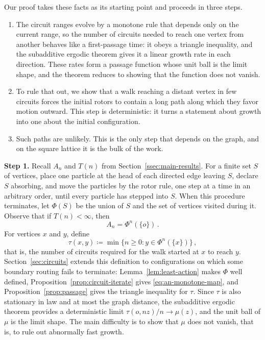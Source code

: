 \documentclass[11pt]{amsart}
\theoremstyle{plain}
\theoremstyle{definition}
\begin{document}
	Our proof takes these facts as its starting point and proceeds in three
	steps.
	\begin{enumerate}[label=\textup{(\arabic*)}]
		\item The circuit ranges evolve by a monotone rule that depends only on the
		current range, so the number of circuits needed to reach one vertex from
		another behaves like a first-passage time: it obeys a triangle inequality,
		and the subadditive ergodic theorem gives it a linear growth rate in each
		direction.  These rates form a passage function whose unit ball is the limit
		shape, and the theorem reduces to showing that the function does not vanish.
		\item To rule that out, we show that a walk reaching a distant vertex in few
		circuits forces the initial rotors to contain a long path along which they
		favor motion outward.  This step is deterministic: it turns a statement about
		growth into one about the initial configuration.
		\item Such paths are unlikely.  This is the only step that depends on the
		graph, and on the square lattice it is the bulk of the work.
	\end{enumerate}
	\medskip
	
	\noindent\textbf{Step 1.}  Recall $A_n$ and $T(n)$ from
	Section~\ref{ssec:main-results}.  For a finite set $S$ of vertices, place one particle at the
	head of each directed edge leaving $S$, declare $S$ absorbing, and move the
	particles by the rotor rule, one step at a time in an arbitrary order, until
	every particle has stepped into $S$.  When this procedure terminates, let
	$\Phi(S)$ be the union of $S$ and the set of vertices visited during it.  Observe that if
	$T(n)<\infty$, then
	\begin{equation}\label{eq:an-monotone-map}
		A_n=\Phi^n(\{o\})\, .
	\end{equation}
	For vertices $x$ and $y$, define
	\begin{equation}\label{eq:stationary-passage-time}
		\tau(x,y)\coloneqq\min\{n\geq0:y\in\Phi^n(\{x\})\}\, ,
	\end{equation}
	that is, the number of circuits required for the walk started at $x$ to reach
	$y$.  Section~\ref{sec:circuits} extends this definition to configurations on
	which some boundary routing fails to terminate:
	Lemma~\ref{lem:least-action} makes $\Phi$ well defined,
	Proposition~\ref{prop:circuit-iterate} gives
	\eqref{eq:an-monotone-map}, and Proposition~\ref{prop:passage} gives the
	triangle inequality for $\tau$.  Since $\tau$ is also stationary in law and at
	most the graph distance, the subadditive ergodic theorem provides a
	deterministic limit $\tau(o,nz)/n\to\mu(z)$, and the unit ball of $\mu$ is the
	limit shape.  The main
	difficulty is to show that $\mu$ does not vanish, that is, to rule out
	abnormally fast growth.
	
\end{document}
